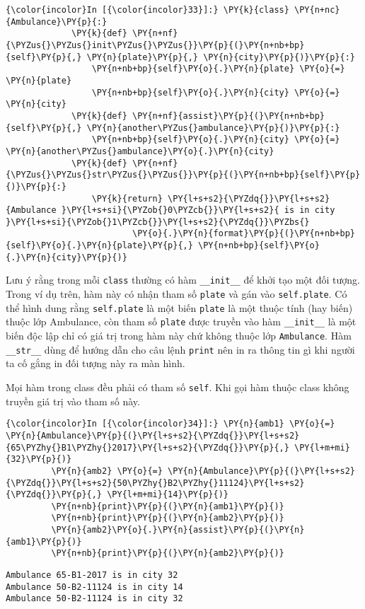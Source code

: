    
\begin{Verbatim}[commandchars=\\\{\}]
{\color{incolor}In [{\color{incolor}33}]:} \PY{k}{class} \PY{n+nc}{Ambulance}\PY{p}{:}
             \PY{k}{def} \PY{n+nf}{\PYZus{}\PYZus{}init\PYZus{}\PYZus{}}\PY{p}{(}\PY{n+nb+bp}{self}\PY{p}{,} \PY{n}{plate}\PY{p}{,} \PY{n}{city}\PY{p}{)}\PY{p}{:}
                 \PY{n+nb+bp}{self}\PY{o}{.}\PY{n}{plate} \PY{o}{=} \PY{n}{plate}
                 \PY{n+nb+bp}{self}\PY{o}{.}\PY{n}{city} \PY{o}{=} \PY{n}{city}
             \PY{k}{def} \PY{n+nf}{assist}\PY{p}{(}\PY{n+nb+bp}{self}\PY{p}{,} \PY{n}{another\PYZus{}ambulance}\PY{p}{)}\PY{p}{:}
                 \PY{n+nb+bp}{self}\PY{o}{.}\PY{n}{city} \PY{o}{=} \PY{n}{another\PYZus{}ambulance}\PY{o}{.}\PY{n}{city}
             \PY{k}{def} \PY{n+nf}{\PYZus{}\PYZus{}str\PYZus{}\PYZus{}}\PY{p}{(}\PY{n+nb+bp}{self}\PY{p}{)}\PY{p}{:}
                 \PY{k}{return} \PY{l+s+s2}{\PYZdq{}}\PY{l+s+s2}{Ambulance }\PY{l+s+si}{\PYZob{}0\PYZcb{}}\PY{l+s+s2}{ is in city }\PY{l+s+si}{\PYZob{}1\PYZcb{}}\PY{l+s+s2}{\PYZdq{}}\PYZbs{}
                         \PY{o}{.}\PY{n}{format}\PY{p}{(}\PY{n+nb+bp}{self}\PY{o}{.}\PY{n}{plate}\PY{p}{,} \PY{n+nb+bp}{self}\PY{o}{.}\PY{n}{city}\PY{p}{)}
\end{Verbatim}
    

    Lưu ý rằng trong mỗi \texttt{class} thường có hàm \texttt{\_\_init\_\_}
để khởi tạo một đối tượng. Trong ví dụ trên, hàm này có nhận tham số
\texttt{plate} và gán vào \texttt{self.plate}. Có thể hình dung rằng
\texttt{self.plate} là một biến \texttt{plate} là một thuộc tính (hay
biến) thuộc lớp Ambulance, còn tham số \texttt{plate} được truyền vào
hàm \texttt{\_\_init\_\_} là một biến độc lập chỉ có giá trị trong hàm
này chứ không thuộc lớp \texttt{Ambulance}. Hàm \texttt{\_\_str\_\_}
dùng để hướng dẫn cho câu lệnh \texttt{print} nên in ra thông tin gì khi
người ta cố gắng in đối tượng này ra màn hình.

Mọi hàm trong class đều phải có tham số \texttt{self}. Khi gọi hàm thuộc
class không truyền giá trị vào tham số này.

    
\begin{Verbatim}[commandchars=\\\{\}]
{\color{incolor}In [{\color{incolor}34}]:} \PY{n}{amb1} \PY{o}{=} \PY{n}{Ambulance}\PY{p}{(}\PY{l+s+s2}{\PYZdq{}}\PY{l+s+s2}{65\PYZhy{}B1\PYZhy{}2017}\PY{l+s+s2}{\PYZdq{}}\PY{p}{,} \PY{l+m+mi}{32}\PY{p}{)}
         \PY{n}{amb2} \PY{o}{=} \PY{n}{Ambulance}\PY{p}{(}\PY{l+s+s2}{\PYZdq{}}\PY{l+s+s2}{50\PYZhy{}B2\PYZhy{}11124}\PY{l+s+s2}{\PYZdq{}}\PY{p}{,} \PY{l+m+mi}{14}\PY{p}{)}
         \PY{n+nb}{print}\PY{p}{(}\PY{n}{amb1}\PY{p}{)}
         \PY{n+nb}{print}\PY{p}{(}\PY{n}{amb2}\PY{p}{)}
         \PY{n}{amb2}\PY{o}{.}\PY{n}{assist}\PY{p}{(}\PY{n}{amb1}\PY{p}{)}
         \PY{n+nb}{print}\PY{p}{(}\PY{n}{amb2}\PY{p}{)}
\end{Verbatim}
    

    \begin{Verbatim}[commandchars=\\\{\}]
Ambulance 65-B1-2017 is in city 32
Ambulance 50-B2-11124 is in city 14
Ambulance 50-B2-11124 is in city 32

    \end{Verbatim}

